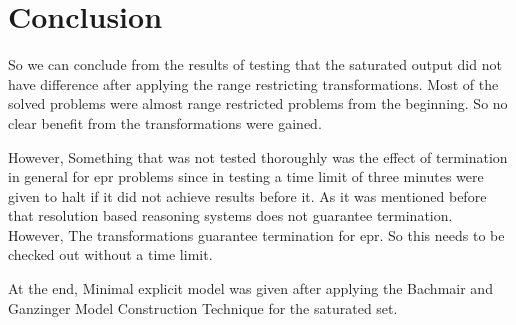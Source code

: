 \chapter{Conclusion}\label{chap:concl}


So we can conclude from the results of testing that the saturated output did not have difference after applying the range restricting transformations. Most of the solved problems were almost range restricted problems from the beginning. So no clear benefit from the transformations were gained.


However, Something that was not tested thoroughly was the effect of termination in general for \ac{epr} problems since in testing a time limit of three minutes were given to halt if it did not achieve results before it. As it was mentioned before that resolution based reasoning systems does not guarantee termination. However, The transformations guarantee termination for \ac{epr}. So this needs to be checked out without a time limit.


At the end, Minimal explicit model was given after applying the Bachmair and Ganzinger Model Construction Technique for the saturated set.

